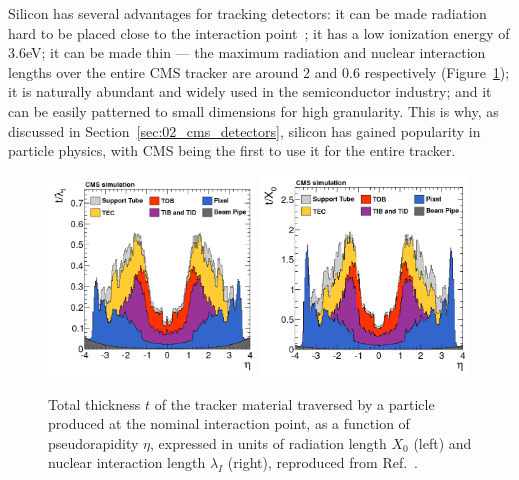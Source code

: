 Silicon has several advantages for tracking detectors: it can be made radiation hard to be placed close to the interaction point~\cite{BaselgaBacardit:2015iqn}; it has a low ionization energy of $3.6$\unit{eV}; it can be made thin --- the maximum radiation and nuclear interaction lengths over the entire CMS tracker are around $2$ and $0.6$ respectively (Figure~\ref{fig:02_cms_tracker_material}); it is naturally abundant and widely used in the semiconductor industry; and it can be easily patterned to small dimensions for high granularity.
This is why, as discussed in Section~\ref{sec:02_cms_detectors}, silicon has gained popularity in particle physics, with CMS being the first to use it for the entire tracker.

\begin{figure}
    \centering
    \includegraphics[width=0.49\textwidth]{figures/02-CMS/cms/components/figs_2011_cmsTracker_MaterialBudget_InteractionLengths.png}
    \includegraphics[width=0.49\textwidth]{figures/02-CMS/cms/components/figs_2011_cmsTracker_MaterialBudget_RadLengths.png}
    \caption[Total thickness $t$ of the tracker material traversed by a particle produced at the nominal interaction point.]{Total thickness $t$ of the tracker material traversed by a particle produced at the nominal interaction point, as a function of pseudorapidity $\eta$, expressed in units of radiation length $X_0$ (left) and nuclear interaction length $\lambda_I$ (right), reproduced from Ref.~\cite{CMS:2014pgm}.}
    \label{fig:02_cms_tracker_material}
\end{figure}


